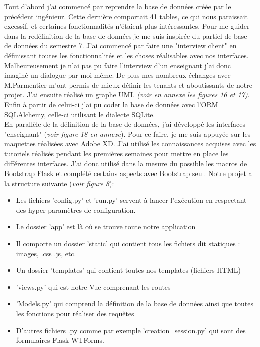 \documentclass[12pt]{article}
\begin{document}
Tout d’abord j’ai commencé par reprendre la base de données créée par le précédent ingénieur. Cette dernière comportait 41 tables, ce qui nous paraissait excessif, et certaines fonctionnalités n'étaient plus intéressantes. Pour me guider dans la redéfinition de la base de données je me suis inspirée du partiel de base de données du semestre 7. J’ai commencé par faire une "interview client" en définissant toutes les fonctionnalités et les choses réalisables avec nos interfaces. Malheureusement je n’ai pas pu faire l’interview d’un enseignant j’ai donc imaginé un dialogue par moi-même. De plus mes nombreux échanges avec M.Parmentier m’ont permis de mieux définir les tenants et aboutissants de notre projet. J’ai ensuite réalisé un graphe UML \textit{(voir en annexe les figures 16 et 17)}. Enfin à partir de celui-ci j’ai pu coder la base de données avec l’ORM SQLAlchemy, celle-ci utilisant le dialecte SQLite. \\

En parallèle de la définition de la base de données, j’ai développé les interfaces "enseignant" (\textit{voir figure 18 en annexe}). Pour ce faire, je me suis appuyée sur les maquettes réalisées avec Adobe XD. J’ai utilisé les connaissances acquises avec les tutoriels réalisés pendant les premières semaines pour mettre en place les différentes interfaces. J’ai donc utilisé dans la mesure du possible les macros de Bootstrap Flask et complété certains aspects avec Bootstrap seul. 
Notre projet a la structure suivante (\textit{voir figure 8}):
\begin{itemize}
    \item Les fichiers 'config.py' et 'run.py' servent à lancer l'exécution en respectant des hyper paramètres de configuration.
    
    \item Le dossier 'app' est là où se trouve toute notre application
    
    \item Il comporte un dossier 'static' qui contient tous les fichiers dit statiques : images, .css .js, etc.
    
    \item  Un dossier 'templates' qui contient toutes nos templates (fichiers HTML)
    
    \item 'views.py' qui est notre Vue comprenant les routes
    
    \item 'Models.py' qui comprend la définition de la base de données ainsi que toutes les fonctions pour réaliser des requêtes
    
    \item D'autres fichiers .py comme par exemple 'creation\_session.py' qui sont des formulaires Flask WTForms.

\end{itemize}
\end{document}
